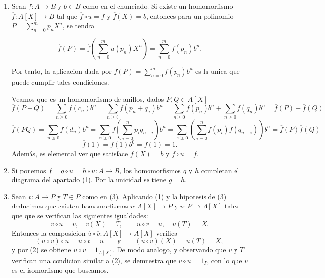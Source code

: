 \begin{proofbox}
\begin{enumerate}
\item Sean \(f:A\to B\) y \(b\in B\) como en el enunciado. Si existe un homomorfismo \(\overline{f}:A[X]\to B\) tal que \(\overline{f}\circ u=f\) y \(\overline{f}(X)=b\), entonces para un polinomio \(P=\sum_{n=0}^{m} p_{n}X^{n}\), se tendra

\[\overline{f}(P)=\overline{f}\left(\sum_{n=0}^{m} u(p_{n})X^{n}\right)=\sum_{n=0}^{m}f(p_{n})b^{n}.\]

Por tanto, la aplicacion dada por \(\overline{f}(P)=\sum_{n=0}^{m}f(p_{n})b^{n}\) es la unica que puede cumplir tales condiciones.

Veamos que es un homomorfismo de anillos, dados \(P,Q \in A[X]\)
\[
\overline{f}(P + Q) = \sum_{n \geq 0}f(c_{n})b^{n} = \sum_{n \geq 0}f(p_{n} + q_n)b^{n} = \sum_{n \geq 0}f(p_{n})b^{n} + \sum_{n \geq 0}f(q_{n})b^{n} = \overline{f}(P) + \overline{f}(Q)
\]
\[
\overline{f}(PQ) = \sum_{n \geq 0}f(d_{n})b^{n} = \sum_{n \geq 0} f(\sum_{i=0}^n p_{i} q_{n-i})b^n = \sum_{n \geq 0} \left(\sum_{i=0}^n f(p_{i}) f(q_{n-i})\right)b^n = \overline{f}(P)\overline{f}(Q)
\]
\[
\overline{f}(1) = f(1)b^0 = f(1) = 1. 
\]
Además, es elemental ver que satisface \(\overline{f}(X)=b\) y \(\overline{f}\circ u=f\).

\item Si ponemos \(f=g\circ u=h\circ u:A\to B\), los homomorfismos \(g\) y \(h\) completan el diagrama del apartado (1). Por la unicidad se tiene \(g=h\).

\item Sean \(v:A\to P\) y \(T\in P\) como en (3). Aplicando (1) y la hipotesis de (3) deducimos que existen homomorfismos \(\overline{v}:A[X]\to P\) y \(\overline{u}:P\to A[X]\) tales que que se verifican las siguientes igualdades:
\[
\overline{v}\circ u=v,\quad\overline{v}(X)=T,\qquad\overline{u}\circ v=u,\quad \overline{u}(T)=X.
\]
Entonces la composicion \(\overline{u}\circ\overline{v}:A[X]\to A[X]\) verifica
\[
(\overline{u}\circ\overline{v})\circ u=\overline{u}\circ v=u\qquad\text{y} \qquad(\overline{u}\circ\overline{v})(X)=\overline{u}(T)=X,
\]
y por (2) se obtiene \(\overline{u}\circ\overline{v} = 1_{A[X]}\). De modo analogo, y observando que \(v\) y \(T\) verifican una condicion similar a (2), se demuestra que \(\overline{v}\circ\overline{u}=1_{P}\), con lo que \(\overline{v}\) es el isomorfismo que buscamos.
\end{enumerate}
\end{proofbox}

